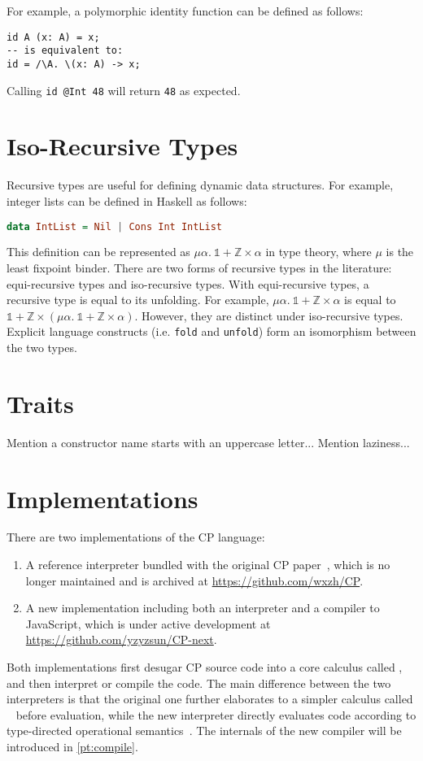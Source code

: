 For example, a polymorphic identity function can be defined as follows:
\begin{lstlisting}
id A (x: A) = x;
-- is equivalent to:
id = /\A. \(x: A) -> x;
\end{lstlisting}
Calling \lstinline{id @Int 48} will return \lstinline{48} as expected.

\section{Iso-Recursive Types}

Recursive types are useful for defining dynamic data structures. For example,
integer lists can be defined in Haskell as follows:
\begin{lstlisting}[language=Haskell]
data IntList = Nil | Cons Int IntList
\end{lstlisting}
This definition can be represented as $\mu \alpha.\: \mathbb{1} + \mathbb{Z}
\times \alpha$ in type theory, where $\mu$ is the least fixpoint binder. There
are two forms of recursive types in the literature: equi-recursive types and
iso-recursive types. With equi-recursive types, a recursive type is equal to its
unfolding. For example, $\mu \alpha.\: \mathbb{1} + \mathbb{Z} \times \alpha$ is
equal to $\mathbb{1} + \mathbb{Z} \times (\mu \alpha.\: \mathbb{1} + \mathbb{Z}
\times \alpha)$. However, they are distinct under iso-recursive types. Explicit
language constructs (i.e. \lstinline{fold} and \lstinline{unfold}) form an
isomorphism between the two types.

\section{Traits}

Mention a constructor name starts with an uppercase letter...
Mention laziness...

\section{Implementations}

There are two implementations of the CP language:
\begin{enumerate}
\item A reference interpreter bundled with the original CP
      paper~\citep{zhang2021compositional}, which is no longer maintained and is
      archived at \url{https://github.com/wxzh/CP}.
\item A new implementation including both an interpreter and a compiler to
      JavaScript, which is under active development at
      \url{https://github.com/yzyzsun/CP-next}.
\end{enumerate}
Both implementations first desugar CP source code into a core calculus called
\fiplus, and then interpret or compile the \fiplus code. The main difference
between the two interpreters is that the original one further elaborates \fiplus
to a simpler calculus called \fco~\citep{bi2019distributive} before evaluation,
while the new interpreter directly evaluates \fiplus code according to
type-directed operational semantics~\citep{huang2021taming,fan2022direct}. The
internals of the new compiler will be introduced in \autoref{pt:compile}.
